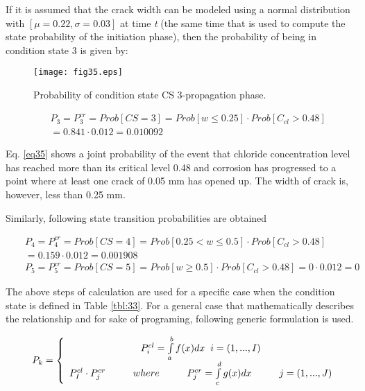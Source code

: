 If it is assumed that the crack width can be modeled using a normal distribution with $\left[ {\mu  = 0.22,\sigma  = 0.03} \right]$ at time \textit{t} (the same time that is used to compute the state probability of the initiation phase), then the probability of being in condition state 3 is given by: 

\begin{figure}[h]
\texttt{[image: fig35.eps]}
\caption{Probability of condition state CS 3-propagation phase.}
\end{figure}

\begin{eqnarray}
      && P_3 = P_3^{cr} = Prob[CS=3]=Prob[w\leq0.25]\cdot Prob[C_{cl}>0.48] \nonumber \\
      && = 0.841 \cdot 0.012 = 0.010092\label{eq35}
\end{eqnarray}

Eq. \eqref{eq35} shows a joint probability of the event that chloride concentration level has reached more than its critical level 0.48 and corrosion has progressed to a point where at least one crack of 0.05 mm has opened up. The width of crack is, however, less than 0.25 mm.

Similarly, following state transition probabilities are obtained

\begin{eqnarray}
      && P_4 = P_4^{cr} = Prob[CS=4]=Prob[0.25 <w\leq0.5]\cdot Prob[C_{cl}>0.48] \nonumber \\
      && = 0.159 \cdot 0.012 = 0.001908\label{stateprobcs4} \\
      && P_5 = P_5^{cr} = Prob[CS=5]=Prob[w\geq 0.5]\cdot Prob[C_{cl}>0.48] = 0 \cdot 0.012 = 0 \label{stateprobcs5}
\end{eqnarray}

The above steps of calculation are used for a specific case when the condition state is defined in Table \ref{tbl:33}. For a general case that mathematically describes the relationship and for sake of programing, following generic formulation is used.

%
\begin{eqnarray}
&& {P_k} = \left\{ {\begin{array}{*{10}{c}}
{P_i^{cl} = \int\limits_a^b {f(x)dx} \hspace{0.2cm}i = (1,...,I){\rm{  }}}\\
{P_I^{cl} \cdot P_j^{cr} \hspace{1cm}   where \hspace{1cm} P_j^{cr} = \int\limits_c^d {g(x)dx} \hspace{1cm}j = (1,...,J)}
\end{array}{\rm{    }}} \right. \label{eq36}
\end{eqnarray}


